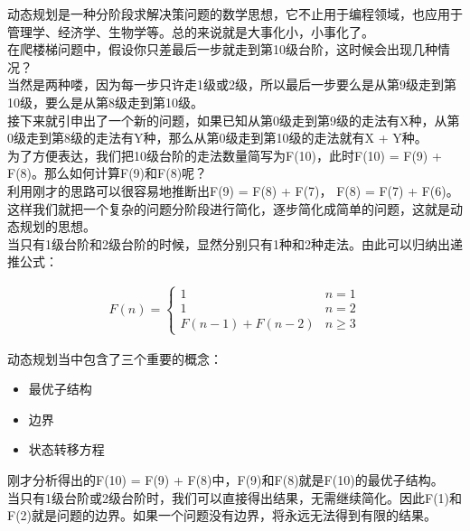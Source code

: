 动态规划是一种分阶段求解决策问题的数学思想，它不止用于编程领域，也应用于管理学、经济学、生物学等。总的来说就是大事化小，小事化了。\\

在爬楼梯问题中，假设你只差最后一步就走到第10级台阶，这时候会出现几种情况？\\

当然是两种喽，因为每一步只许走1级或2级，所以最后一步要么是从第9级走到第10级，要么是从第8级走到第10级。\\

接下来就引申出了一个新的问题，如果已知从第0级走到第9级的走法有X种，从第0级走到第8级的走法有Y种，那么从第0级走到第10级的走法就有X + Y种。\\

为了方便表达，我们把10级台阶的走法数量简写为F(10)，此时F(10) = F(9) + F(8)。那么如何计算F(9)和F(8)呢？\\

利用刚才的思路可以很容易地推断出F(9) = F(8) + F(7)， F(8) = F(7) + F(6)。这样我们就把一个复杂的问题分阶段进行简化，逐步简化成简单的问题，这就是动态规划的思想。\\

当只有1级台阶和2级台阶的时候，显然分别只有1种和2种走法。由此可以归纳出递推公式：

\vspace{-0.5cm}

\begin{align*}
	F(n) = \begin{cases}
		1               & n = 1   \\
		1               & n = 2   \\
		F(n-1) + F(n-2) & n \ge 3
	\end{cases}
\end{align*}

动态规划当中包含了三个重要的概念：

\begin{itemize}
	\item 最优子结构
	\item 边界
	\item 状态转移方程
\end{itemize}

刚才分析得出的F(10) = F(9) + F(8)中，F(9)和F(8)就是F(10)的最优子结构。\\

当只有1级台阶或2级台阶时，我们可以直接得出结果，无需继续简化。因此F(1)和F(2)就是问题的边界。如果一个问题没有边界，将永远无法得到有限的结果。\\


